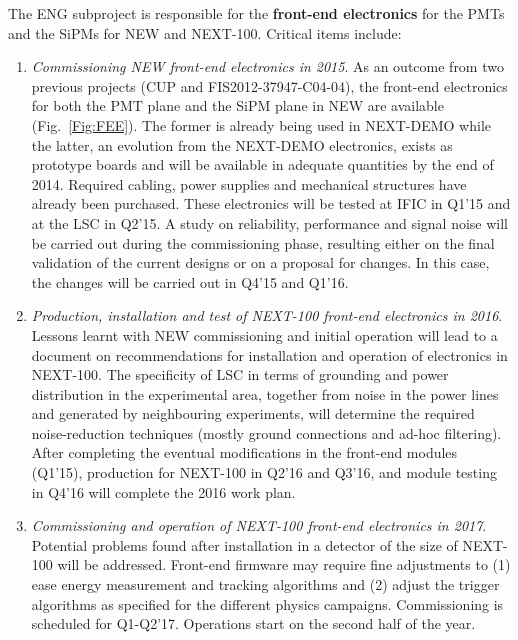 The ENG subproject is responsible for the {\bf front-end electronics} for the PMTs and the SiPMs for NEW and NEXT-100. Critical items include:
%
\begin{enumerate}
\item	{\em Commissioning NEW front-end electronics in 2015}. As an outcome from two previous projects (CUP and FIS2012-37947-C04-04), the front-end electronics for both the PMT plane and the SiPM plane in NEW are available (Fig.~\ref{Fig:FEE}). The former is already being used in NEXT-DEMO while the latter, an evolution from the NEXT-DEMO electronics, exists as prototype boards and will be available in adequate quantities by the end of 2014. Required cabling, power supplies and mechanical structures have already been purchased.
These electronics will be tested at IFIC in Q1’15 and at the LSC in Q2’15. A study on reliability, performance and signal noise will be carried out during the commissioning phase, resulting either on the final validation of the current designs or on a proposal for changes. In this case, the changes will be carried out in Q4’15 and Q1’16.

\item {\em Production, installation and test of NEXT-100 front-end electronics in 2016}. Lessons learnt with NEW commissioning and initial operation will lead to a document on recommendations for installation and operation of electronics in NEXT-100. The specificity of LSC in terms of grounding and power distribution in the experimental area, together from noise in the power lines and generated by neighbouring experiments, will determine the required noise-reduction techniques (mostly ground connections and ad-hoc filtering). After completing the eventual modifications in the front-end modules (Q1'15), production for NEXT-100 in Q2’16 and Q3'16, and module testing in Q4’16 will complete the 2016 work plan.

\item {\em Commissioning and operation of NEXT-100 front-end electronics in 2017}. Potential problems found after installation in a detector of the size of NEXT-100 will be addressed. Front-end firmware may require fine adjustments to (1) ease energy measurement and tracking algorithms and (2) adjust the trigger algorithms as specified for the different physics campaigns. Commissioning is scheduled for Q1-Q2’17. Operations start on the second half of the year.
\end{enumerate}



